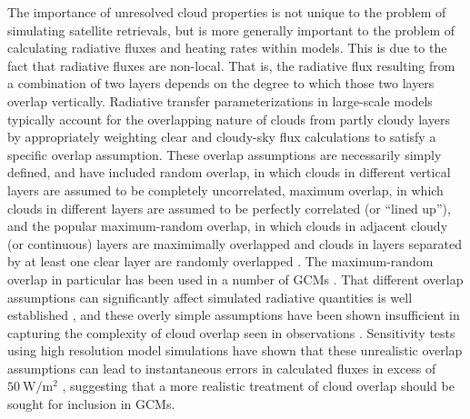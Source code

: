 The importance of unresolved cloud properties is not unique to the
problem of simulating satellite retrievals, but is more generally
important to the problem of calculating radiative fluxes and heating
rates within models. This is due to the fact that radiative fluxes are
non-local. That is, the radiative flux resulting from a combination of
two layers depends on the degree to which those two layers overlap
vertically. Radiative transfer parameterizations in large-scale models
typically account for the overlapping nature of clouds from partly
cloudy layers by appropriately weighting clear and cloudy-sky flux
calculations to satisfy a specific overlap assumption. These overlap
assumptions are necessarily simply defined, and have included random
overlap, in which clouds in different vertical layers are assumed to be
completely uncorrelated, maximum overlap, in which clouds in different
layers are assumed to be perfectly correlated (or ``lined up''), and the
popular maximum-random overlap, in which clouds in adjacent cloudy (or
continuous) layers are maximimally overlapped and clouds in layers
separated by at least one clear layer are randomly overlapped
\citep{geleyn_and_hollingsworth_1979, tian_and_curry_1989}. The
maximum-random overlap in particular has been used in a number of GCMs
\citep[e.g.,][]{collins_et_al_2004, neale_et_al_2010a, neale_et_al_2010b}.
That different overlap assumptions can significantly affect simulated
radiative quantities is well established
\citep[e.g.,][]{morcrette_and_fouquart_1986, stubenrauch_et_al_1997, barker_et_al_1999},
and these overly simple assumptions have been shown insufficient in
capturing the complexity of cloud overlap seen in observations
\citep{hogan_and_illingworth_2000, mace_and_benson-troth_2002, barker_2008}.
Sensitivity tests using high resolution model simulations have shown
that these unrealistic overlap assumptions can lead to instantaneous
errors in calculated fluxes in excess of \(50~\textrm{W}/\textrm{m}^2\)
\citep{barker_et_al_1999, wu_and_liang_2005}, suggesting that a more
realistic treatment of cloud overlap should be sought for inclusion in
GCMs.

